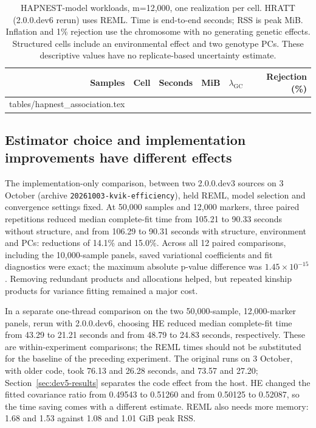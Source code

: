 \documentclass[11pt]{article}
\makeatletter
\newcommand{\lgc}{\lambda_{\mathrm{GC}}}
\newcommand{\code}[1]{\texttt{#1}}
\newcommand{\tabinput}[1]{\@@input #1 }
\makeatother
\begin{document}
\begin{table}[htbp]
 \centering\small
 \caption{HAPNEST-model workloads, m=12,000, one realization per cell.
 HRATT (2.0.0.dev6 rerun) uses REML.
 Time is end-to-end seconds; RSS is peak MiB. Inflation and 1\%
 rejection use the chromosome with no generating genetic effects.
 Structured cells include an environmental effect and two genotype PCs.
 These descriptive values have no replicate-based uncertainty estimate.}
 \label{tab:hapnest-association}
 \begin{tabular}{@{}rlrrrr@{}}
 \toprule
 Samples & Cell & Seconds & MiB & $\lgc$ & Rejection (\%) \\
 \midrule
 \tabinput{tables/hapnest_association.tex}
 \bottomrule
 \end{tabular}
\end{table}

\subsection{Estimator choice and implementation improvements have different effects}
\label{sec:he-results}

The implementation-only comparison, between two 2.0.0.dev3 sources on
3 October (archive \code{20261003-kvik-efficiency}), held REML, model
selection and convergence settings fixed. At 50,000 samples and 12,000 markers,
three paired repetitions reduced median complete-fit time from 105.21
to 90.33 seconds without structure, and from 106.29 to 90.31 seconds
with structure, environment and PCs: reductions of 14.1\% and 15.0\%.
Across all 12 paired comparisons, including the 10,000-sample panels,
saved variational coefficients and fit diagnostics were exact; the
maximum absolute p-value difference was $1.45\times10^{-15}$.
Removing redundant products and allocations helped, but repeated kinship
products for variance fitting remained a major cost.

In a separate one-thread comparison on the two 50,000-sample,
12,000-marker panels, rerun with 2.0.0.dev6, choosing HE reduced median
complete-fit time from 43.29 to 21.21 seconds and from 48.79 to 24.83
seconds, respectively. These are within-experiment comparisons; the REML
times should not be substituted for the baseline of the preceding
experiment. The original runs on 3 October, with older code, took 76.13
and 26.28 seconds, and 73.57 and 27.20; Section~\ref{sec:dev5-results}
separates the code effect from the host. HE changed the fitted
covariance ratio from 0.49543 to 0.51260 and from 0.50125 to 0.52087,
so the time saving comes with a different estimate. REML also needs more memory: 1.68 and
1.53 against 1.08 and 1.01 GiB peak RSS.
\end{document}

